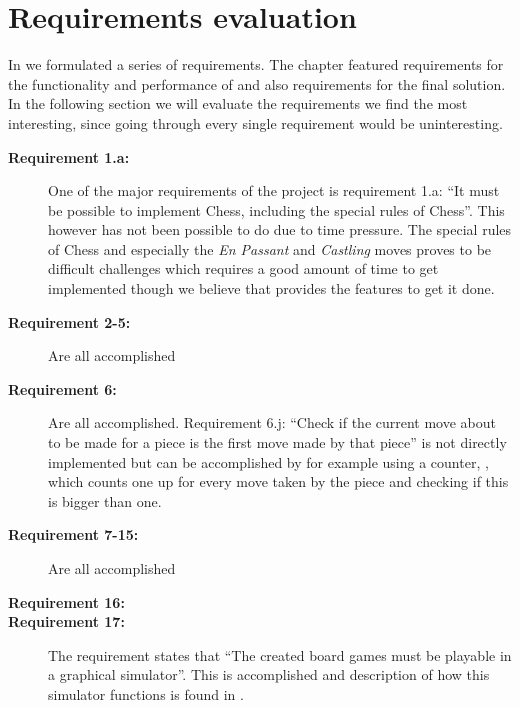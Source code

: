 \section{Requirements evaluation}
\label{sec:requirementsevaluation}

In  we formulated a series of requirements. The chapter featured requirements for the functionality and performance of \productname{} and also requirements for the final solution. In the following section we will evaluate the requirements we find the most interesting, since going through every single requirement would be uninteresting. 

\begin{description}
\item[\textbf{Requirement 1.a:}]
One of the major requirements of the project is requirement 1.a: ``It must be possible to implement Chess, including the special rules of Chess''. This however has not been possible to do due to time pressure. The special rules of Chess and especially the \emph{En Passant} and \emph{Castling} moves proves to be difficult challenges which requires a good amount of time to get implemented though we believe that \productname{} provides the features to get it done.

\item[\textbf{Requirement 2-5:}]
Are all accomplished

\item[\textbf{Requirement 6:}]
Are all accomplished. Requirement 6.j: ``Check if the current move about to be made for a piece is the first move made by that piece'' is not directly implemented but can be accomplished by for example using a counter, , which counts one up for every move taken by the piece and checking if this is bigger than one.

\item[\textbf{Requirement 7-15:}]
Are all accomplished

\item[\textbf{Requirement 16:}]

\item[\textbf{Requirement 17:}]
The requirement states that  ``The created board games must be playable in a graphical simulator''. This is accomplished and description of how this
simulator functions is found in .


\end{description}
